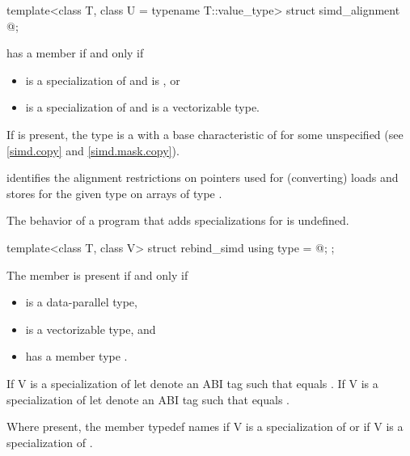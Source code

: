 \begin{itemdecl}
template<class T, class U = typename T::value_type> struct simd_alignment { @\seebelow@ };
\end{itemdecl}

\begin{itemdescr}
\pnum
{} has a member  if and only if
\begin{itemize}
  \item {} is a specialization of  and  is , or
  \item {} is a specialization of  and  is a vectorizable type.
\end{itemize}

\pnum
If  is present, the type  is a  with
a base characteristic of  for some unspecified
 (see \ref{simd.copy} and \ref{simd.mask.copy}). \begin{note} identifies the
alignment restrictions on pointers used for (converting) loads and stores for the given type
 on arrays of type .\end{note}

\pnum
The behavior of a program that adds specializations for  is undefined.
\end{itemdescr}

\begin{itemdecl}
template<class T, class V> struct rebind_simd { using type = @\seebelow@; };
\end{itemdecl}

\begin{itemdescr}
  \pnum
  The member  is present if and only if
  \begin{itemize}
    \item {} is a data-parallel type,
    \item {} is a vectorizable type, and
    \item {} has a member type .
  \end{itemize}

  \pnum
  If \tcode V is a specialization of  let  denote an ABI tag such that
   equals .
  If \tcode V is a specialization of  let  denote an ABI tag such
  that  equals .

  \pnum
  Where present, the member typedef  names  if \tcode V is a
  specialization of  or  if \tcode V is a
  specialization of .
\end{itemdescr}

